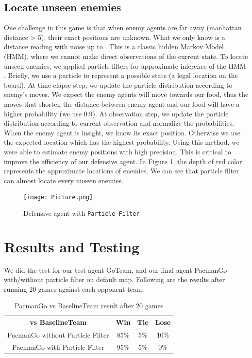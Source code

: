 \subsection{Locate unseen enemies}
One challenge in this game is that when enemy agents are far away (manhattan distance > 5), 
their exact positions are unknown. What we only know is a distance reading with noise up to .  
This is a classic hidden Markov Model (HMM), where we cannot make direct observations of the 
current state. To locate unseen enemies, we applied particle filters for approximate inference 
of the HMM \cite{CS188} \cite{Thrun02d} \cite{Wikipedia}. Briefly, we use a particle to represent 
a possible state (a legal location on the board). 
At time elapse step, we update the particle distribution according to enemy's moves. 
We expect the enemy agents will move towards our food, thus the moves that shorten the 
distance between enemy agent and our food will have a higher probability (we use 0.9). 
At observation step, we update the particle distribution according to current observation 
and normalize the probabilities. When the enemy agent is insight, we know its exact position. 
Otherwise we use the expected location which has the highest probability. Using this method, 
we were able to estimate enemy positions with high precision. This is critical to improve the 
efficiency of our defensive agent. In Figure 1, the depth of red color represents the approximate
locations of enemies. We can see that particle filter can almost locate every unseen enemies. 

\begin{figure}[!htb]
\texttt{[image: Picture.png]}
\caption{Defensive agent with \texttt{Particle Filter}}
\end{figure}


\section{Results and Testing}
We did the test for our test agent GoTeam, and our final agent PacmanGo with/without particle filter
on default map.  Following are the results after running 20 games against each opponent team. 

\begin{table}[!htb]
  \caption{PacmanGo vs BaselineTeam result after 20 games}
  \label{4}
  \begin{tabular}{c|ccc}
    \toprule
    vs BaselineTeam & Win & Tie & Lose \\
    \midrule
    PacmanGo without Particle Filter & 85\% & 5\% & 10\%\\
    PacmanGo with Particle Filter & 95\% & 5\% & 0\%\\
    
  \bottomrule
\end{tabular}
\end{table}


